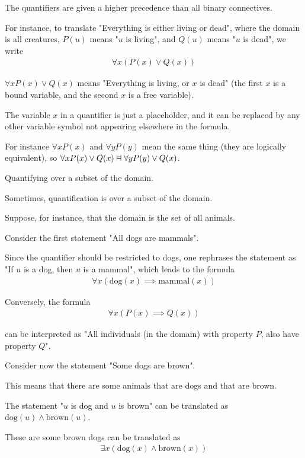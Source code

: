 \documentclass{article}
\newcommand{\vDashv}{%
  \mathrel{%
    \text{%
      \ooalign{$\vDash$\cr\reflectbox{$\vDash$}\cr}%
    }%
  }%
}
\begin{document}
The quantifiers are given a higher precedence than all binary connectives.

For instance, to translate "Everything is either living or dead", where the domain is all creatures, $P(u)$ means "$u$ is living", and $Q(u)$ means "$u$ is dead", we write
\begin{align*}
\forall x (P(x) \vee Q(x))
\end{align*}

$\forall x P(x) \vee Q(x)$ means "Everything is living, or $x$ is dead" (the first $x$ is a bound variable, and the second $x$ is a free variable).

The variable $x$ in a quantifier is just a placeholder, and it can be replaced by any other variable symbol not appearing elsewhere in the formula.

For instance $\forall x P(x)$ and $\forall y P(y)$ mean the same thing (they are logically equivalent), so $\forall x P(x) \vee Q(x) \vDashv \forall y P(y) \vee Q(x)$.

Quantifying over a subset of the domain.

Sometimes, quantification is over a subset of the domain.

Suppose, for instance, that the domain is the set of all animals. 


Consider the first statement "All dogs are mammals".

Since the quantifier should be restricted to dogs, one rephrases the statement as "If $u$ is a dog, then $u$ is a mammal", which leads to the formula
\begin{align*}
\forall x (\text{dog}(x) \implies \text{mammal}(x))
\end{align*}

Conversely, the formula
\begin{align*}
\forall x (P(x) \implies Q(x))
\end{align*}

can be interpreted as "All individuals (in the domain) with property $P$, also have property $Q$". 

Consider now the statement "Some dogs are brown".

This means that there are some animals that are dogs and that are brown.

The statement "$u$ is dog and $u$ is brown" can be translated as $\text{dog}(u) \wedge \text{brown}(u)$.

These are some brown dogs can be translated as
\begin{align*}
\exists x(\text{dog}(x) \wedge \text{brown}(x))
\end{align*}
\end{document}

